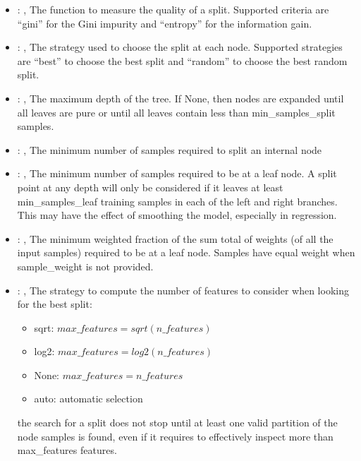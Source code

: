 \begin{itemize}
    \item {}: , 
      The function to measure the quality of a split. Supported criteria are ``gini'' for the
      Gini impurity and ``entropy'' for the information gain.

    \item {}: , 
      The strategy used to choose the split at each node. Supported strategies are ``best''
      to choose the best split and ``random'' to choose the best random split.

    \item {}: , 
      The maximum depth of the tree. If None, then nodes are expanded until all leaves are pure
      or until all leaves contain less than min\_samples\_split samples.

    \item {}: , 
      The minimum number of samples required to split an internal node

    \item {}: , 
      The minimum number of samples required to be at a leaf node. A split point at any
      depth will only be considered if it leaves at least min\_samples\_leaf training samples in
      each                                                  of the left and right branches. This may
      have the effect of smoothing the model, especially
      in regression.

    \item {}: , 
      The minimum weighted fraction of the sum total of weights (of all the input samples)
      required to be at a leaf node. Samples have equal weight when sample\_weight is not provided.

    \item {}: , 
      The strategy to compute the number of features to consider when looking for the best split:
      \begin{itemize}                                                     \item sqrt:
      $max\_features=sqrt(n\_features)$                                                     \item
      log2: $max\_features=log2(n\_features)$
      \item None: $max\_features=n\_features$
      \item auto: automatic selection
      \end{itemize}                                                   \nb the search for a split
      does not stop until at least one valid partition of the node
      samples is found, even if it requires to effectively inspect more than max\_features features.


\end{itemize}
